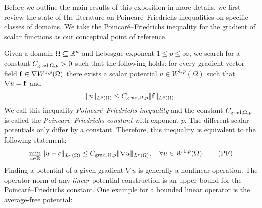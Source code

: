 \documentclass[12pt,a4paper]{article}
\begin{document}
Before we outline the main results of this exposition in more details, 
we first review the state of the literature on Poincar\'e--Friedrichs inequalities on specific classes of domains. 
We take the Poincar\'e--Friedrichs inequality for the gradient of scalar functions as our conceptual point of reference.

Given a domain $\Omega \subseteq {\mathbb R}^{n}$ and Lebesgue exponent $1 \leq p \leq \infty$,
we search for a constant $C_{\operatorname{grad},\Omega,p} > 0$ such that the following holds:
for every gradient vector field ${\mathbf f} \in \nabla W^{1,p}(\Omega)$ there exists a scalar potential $u \in W^{1,p}(\Omega)$
such that $\nabla u = {\mathbf f}$ and 
\begin{align}\label{math:intro:inequalitypf:gradient}
    \| u \|_{L^{p}(\Omega)}
    \leq 
    C_{\operatorname{grad},\Omega,p} 
    \| {\mathbf f} \|_{L^{p}(\Omega)}
    .
\end{align}
We call this inequality \emph{Poincar\'e--Friedrichs inequality} and the constant $C_{\operatorname{grad},\Omega,p}$ is called the \emph{Poincar\'e--Friedrichs constant} with exponent $p$. 
The different scalar potentials only differ by a constant. 
Therefore, %
this inequality is equivalent to the following statement: 
\begin{align}\label{math:intro:poincarefriedrichs:grad}
    \min\limits_{c\in\bbR}
    \| u - c \|_{L^{p}(\Omega)}
    \leq 
    C_{\grad,\Omega,p} \| \nabla u \|_{L^p(\Omega)},
    \quad 
    \forall
    u \in W^{1,p}(\Omega) %
    .\tag{PF} 
\end{align}
Finding a potential of a given gradient $\nabla u$ is generally a nonlinear operation. 
The operator norm of any \emph{linear} potential construction is an upper bound for the Poincar\'e--Friedrichs constant. 
One example for a bounded linear operator is the average-free potential:
\end{document}
